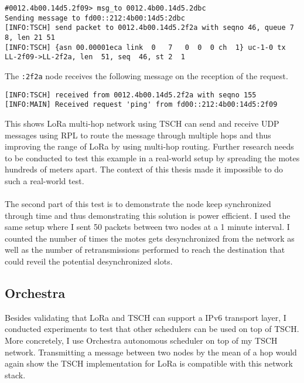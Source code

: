 \begin{lstlisting}[language=none]
#0012.4b00.14d5.2f09> msg_to 0012.4b00.14d5.2dbc
Sending message to fd00::212:4b00:14d5:2dbc
[INFO:TSCH] send packet to 0012.4b00.14d5.2f2a with seqno 46, queue 7 8, len 21 51
[INFO:TSCH] {asn 00.00001eca link  0   7   0  0  0 ch  1} uc-1-0 tx LL-2f09->LL-2f2a, len  51, seq  46, st 2  1
\end{lstlisting}

The \lstinline{:2f2a} node receives the following message on the reception of the
request.

\begin{lstlisting}[language=none]
[INFO:TSCH] received from 0012.4b00.14d5.2f2a with seqno 155
[INFO:MAIN] Received request 'ping' from fd00::212:4b00:14d5:2f09
\end{lstlisting}

This shows LoRa multi-hop network using TSCH can send and receive UDP messages
using RPL to route the message through multiple hops and thus improving the
range of LoRa by using multi-hop routing.
Further research needs to be conducted to test this example in a real-world
setup by spreading the motes hundreds of meters apart.
The context of this thesis made it impossible to do such a real-world test.

\paragraph{}

The second part of this test is to demonstrate the node keep synchronized
through time and thus demonstrating this solution is power efficient.
I used the same setup where I sent 50 packets between two nodes at a 1 minute
interval. I counted the number of times the motes gets desynchronized from the
network as well as the number of retransmissions performed to reach the
destination that could reveil the potential desynchronized slots.


\subsection{Orchestra\label{section:tschorchestra}}

Besides validating that LoRa and TSCH can support a IPv6 transport
layer, I conducted experiments to test that other schedulers can be used on top
of TSCH. More concretely, I use Orchestra autonomous scheduler on top of my TSCH network.
Transmitting a message between two nodes by the mean of a hop would again show
the TSCH implementation for LoRa is compatible with this network stack.

